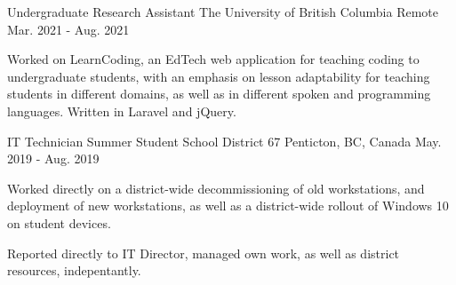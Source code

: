 

\begin{cventries}

  \cventry
    {Undergraduate Research Assistant} %
    {The University of British Columbia} %
    {Remote} %
    {Mar. 2021 - Aug. 2021} %
    {
      \begin{cvitems} %
        \item 
        {
            Worked on LearnCoding, an EdTech web application for teaching 
            coding to undergraduate students, with an emphasis on lesson 
            adaptability for teaching students in different domains, as well 
            as in different spoken and programming languages. Written in 
            Laravel and jQuery.
        }
      \end{cvitems}
    }

  \cventry
    {IT Technician Summer Student} %
    {School District 67} %
    {Penticton, BC, Canada} %
    {May. 2019 - Aug. 2019} %
    {
      \begin{cvitems} %
        \item 
        {
            Worked directly on a district-wide decommissioning of old 
            workstations, and deployment of new workstations, as well as a
            district-wide rollout of Windows 10 on student devices.
        }
        \item
        {
            Reported directly to IT Director, managed own work, as well as district
            resources, indepentantly.
        }
      \end{cvitems}
    }

\end{cventries}
